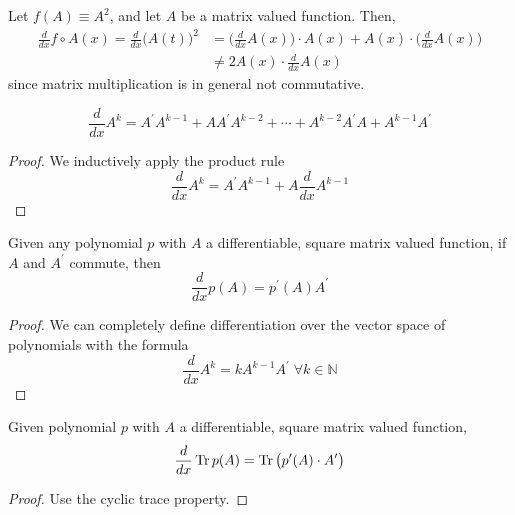   \begin{example}[Derivative of $A^2$]
    Let $f(A) \equiv A^2$, and let $A$ be a matrix valued function. Then, 
    \begin{align*}
      \frac{d}{d x} f \circ A(x) = \frac{d}{d x} \big( A(t) \big)^2 & = \bigg( \frac{d}{d x} A(x) \bigg) \cdot A(x) + A(x) \cdot \bigg( \frac{d}{d x} A(x) \bigg) \\
      & \neq 2 A(x) \cdot \frac{d}{d x} A(x)
    \end{align*}
    since matrix multiplication is in general not commutative. 
  \end{example}

  \begin{theorem}
    \begin{equation}
      \frac{d}{d x} A^k = A^\prime A^{k-1} + A A^\prime A^{k-2} + \cdots + A^{k-2} A^\prime A + A^{k-1} A^\prime
    \end{equation}
  \end{theorem}
  \begin{proof}
    We inductively apply the product rule
    \begin{equation}
      \frac{d}{d x} A^k = A^\prime A^{k-1} + A \frac{d}{d x} A^{k-1}
    \end{equation}
  \end{proof}

  \begin{corollary}
    Given any polynomial $p$ with $A$ a differentiable, square matrix valued function, if $A$ and $A^\prime$ commute, then 
    \begin{equation}
      \frac{d}{d x} p(A) = p^\prime (A) A^\prime
    \end{equation}
  \end{corollary}
  \begin{proof}
    We can completely define differentiation over the vector space of polynomials with the formula
    \begin{equation}
      \frac{d}{d x} A^k = k A^{k-1} A^\prime \; \forall k \in \mathbb{N}
    \end{equation}
  \end{proof}

  \begin{corollary}
    Given polynomial $p$ with $A$ a differentiable, square matrix valued function, 
    \begin{equation}
      \frac{d}{d x} \operatorname{Tr}{p(A)} = \operatorname{Tr}{\big( p^\prime(A) \cdot A^\prime \big)}
    \end{equation}
  \end{corollary}
  \begin{proof}
    Use the cyclic trace property.
  \end{proof}

